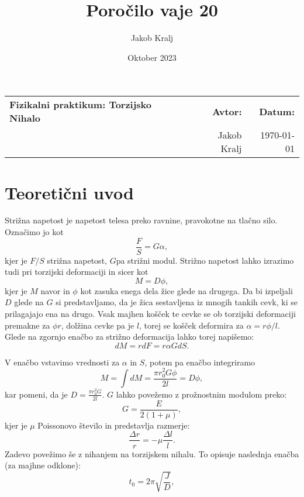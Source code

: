 \documentclass{article}
\title{Poročilo vaje 20}
\author{Jakob Kralj}
\date{Oktober 2023}
\begin{document}
\begin{center}
\begin{tabular}{l@{\hskip 3cm}r@{\hskip 2cm}r}
\textbf{Fizikalni praktikum: Torzijsko Nihalo} & \textbf{Avtor:} & \textbf{Datum:} \\
& Jakob Kralj & \today \\
\end{tabular}
\end{center}

\section{Teoretični uvod}

Strižna napetost je napetost telesa preko ravnine, pravokotne na tlačno silo. Označimo jo kot
\begin{equation*}
    \frac{F}{S} = G \alpha,
\end{equation*}
kjer je $ F/S $ strižna napetost, $ G $pa strižni modul. Strižno napetost lahko izrazimo tudi pri torzijski deformaciji in sicer kot
\begin{equation*}
    M = D \phi,
\end{equation*}
kjer je $ M $ navor in $ \phi $ kot zasuka enega dela žice glede na drugega. Da bi izpeljali $ D $ glede na $ G $ si predstavljamo, da je žica sestavljena iz mnogih tankih cevk, ki se prilagajajo ena na drugo. Vsak majhen košček te cevke se ob torzijski deformaciji premakne za $ \phi r $, dolžina cevke pa je $ l $, torej se košček deformira za $ \alpha = r \phi / l $. Glede na zgornjo enačbo za strižno deformacija lahko torej napišemo:
\begin{equation*}
    dM = r dF = r \alpha G dS.
\end{equation*}

V enačbo vstavimo vrednosti za $ \alpha $ in $ S $, potem pa enačbo integriramo
\begin{equation} \label{eq:3}
    M = \int dM = \frac{\pi r_0^{2} G \phi}{2 l} =  D \phi,
\end{equation}
kar pomeni, da je $ D = \frac{\pi r_0^{2} G}{2l} $. $ G $ lahko povežemo z prožnostnim modulom preko:
\begin{equation}
G = \frac{E}{2(1 + \mu)},
\end{equation}
kjer je $ \mu $ Poissonovo število in predstavlja razmerje:
\begin{equation*}
    \frac{\Delta r}{r} = - \mu \frac{\Delta l}{l}.
\end{equation*}
Zadevo povežimo še z nihanjem na torzijskem nihalu. To opisuje naslednja enačba (za majhne odklone):
\begin{equation} \label{eq:2}
    t_0 = 2 \pi \sqrt{\frac{J}{D}},
\end{equation}
\end{document}
